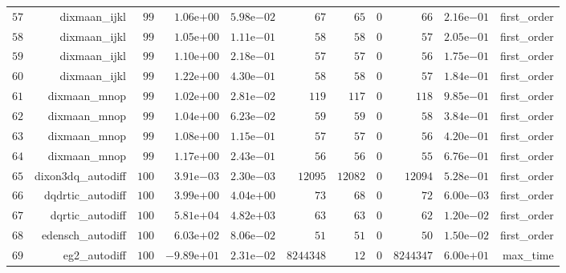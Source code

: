 \documentclass[varwidth=20cm,crop=true]{standalone}
\begin{document}
\begin{longtable}{rrrrrrrrrrr}
  \(    57\) & dixmaan\_ijkl & \(    99\) & \( 1.06\)e\(+00\) & \( 5.98\)e\(-02\) & \(    67\) & \(    65\) & \(     0\) & \(    66\) & \( 2.16\)e\(-01\) & first\_order \\
  \(    58\) & dixmaan\_ijkl & \(    99\) & \( 1.05\)e\(+00\) & \( 1.11\)e\(-01\) & \(    58\) & \(    58\) & \(     0\) & \(    57\) & \( 2.05\)e\(-01\) & first\_order \\
  \(    59\) & dixmaan\_ijkl & \(    99\) & \( 1.10\)e\(+00\) & \( 2.18\)e\(-01\) & \(    57\) & \(    57\) & \(     0\) & \(    56\) & \( 1.75\)e\(-01\) & first\_order \\
  \(    60\) & dixmaan\_ijkl & \(    99\) & \( 1.22\)e\(+00\) & \( 4.30\)e\(-01\) & \(    58\) & \(    58\) & \(     0\) & \(    57\) & \( 1.84\)e\(-01\) & first\_order \\
  \(    61\) & dixmaan\_mnop & \(    99\) & \( 1.02\)e\(+00\) & \( 2.81\)e\(-02\) & \(   119\) & \(   117\) & \(     0\) & \(   118\) & \( 9.85\)e\(-01\) & first\_order \\
  \(    62\) & dixmaan\_mnop & \(    99\) & \( 1.04\)e\(+00\) & \( 6.23\)e\(-02\) & \(    59\) & \(    59\) & \(     0\) & \(    58\) & \( 3.84\)e\(-01\) & first\_order \\
  \(    63\) & dixmaan\_mnop & \(    99\) & \( 1.08\)e\(+00\) & \( 1.15\)e\(-01\) & \(    57\) & \(    57\) & \(     0\) & \(    56\) & \( 4.20\)e\(-01\) & first\_order \\
  \(    64\) & dixmaan\_mnop & \(    99\) & \( 1.17\)e\(+00\) & \( 2.43\)e\(-01\) & \(    56\) & \(    56\) & \(     0\) & \(    55\) & \( 6.76\)e\(-01\) & first\_order \\
  \(    65\) & dixon3dq\_autodiff & \(   100\) & \( 3.91\)e\(-03\) & \( 2.30\)e\(-03\) & \( 12095\) & \( 12082\) & \(     0\) & \( 12094\) & \( 5.28\)e\(-01\) & first\_order \\
  \(    66\) & dqdrtic\_autodiff & \(   100\) & \( 3.99\)e\(+00\) & \( 4.04\)e\(+00\) & \(    73\) & \(    68\) & \(     0\) & \(    72\) & \( 6.00\)e\(-03\) & first\_order \\
  \(    67\) & dqrtic\_autodiff & \(   100\) & \( 5.81\)e\(+04\) & \( 4.82\)e\(+03\) & \(    63\) & \(    63\) & \(     0\) & \(    62\) & \( 1.20\)e\(-02\) & first\_order \\
  \(    68\) & edensch\_autodiff & \(   100\) & \( 6.03\)e\(+02\) & \( 8.06\)e\(-02\) & \(    51\) & \(    51\) & \(     0\) & \(    50\) & \( 1.50\)e\(-02\) & first\_order \\
  \(    69\) & eg2\_autodiff & \(   100\) & \(-9.89\)e\(+01\) & \( 2.31\)e\(-02\) & \(8244348\) & \(    12\) & \(     0\) & \(8244347\) & \( 6.00\)e\(+01\) & max\_time \\

\end{longtable}
\end{document}
